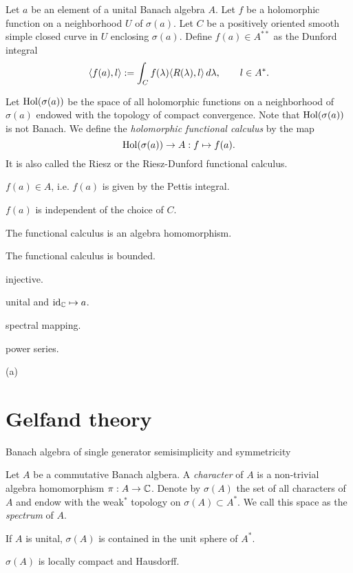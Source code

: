 \documentclass{../../large}
\begin{document}
\begin{prb}
Let $a$ be an element of a unital Banach algebra $A$.
Let $f$ be a holomorphic function on a neighborhood $U$ of $\sigma(a)$.
Let $C$ be a positively oriented smooth simple closed curve in $U$ enclosing $\sigma(a)$.
Define $f(a)\in A^{**}$ as the Dunford integral
\[\langle f(a),l\rangle:=\int_Cf(\lambda)\langle R(\lambda),l\rangle\,d\lambda,\qquad l\in A^*.\]

Let $\operatorname{Hol}(\sigma(a))$ be the space of all holomorphic functions on a neighborhood of $\sigma(a)$ endowed with the topology of compact convergence.
Note that $\operatorname{Hol}(\sigma(a))$ is not Banach.
We define the \emph{holomorphic functional calculus} by the map
\[\operatorname{Hol}(\sigma(a))\to A:f\mapsto f(a).\]
It is also called the Riesz or the Riesz-Dunford functional calculus.
\begin{parts}
\item $f(a)\in A$, i.e. $f(a)$ is given by the Pettis integral.
\item $f(a)$ is independent of the choice of $C$.
\item The functional calculus is an algebra homomorphism.
\item The functional calculus is bounded.
\item injective.
\item unital and $\operatorname{id}_{\mathbb{C}}\mapsto a$.
\item spectral mapping.
\item power series.
\end{parts}
\end{prb}
\begin{pf}
(a)


\end{pf}





\section{Gelfand theory}

Banach algebra of single generator
semisimplicity and symmetricity

\begin{prb}
Let $A$ be a commutative Banach algbera.
A \emph{character} of $A$ is a non-trivial algebra homomorphism $\pi:A\to\mathbb{C}$.
Denote by $\sigma(A)$ the set of all characters of $A$ and endow with the weak$^*$ topology on $\sigma(A)\subset A^*$.
We call this space as the \emph{spectrum} of $A$.
\begin{parts}
\item If $A$ is unital, $\sigma(A)$ is contained in the unit sphere of $A^*$.
\item $\sigma(A)$ is locally compact and Hausdorff.
\end{parts}
\end{prb}
\begin{pf}

\end{pf}
\end{document}
